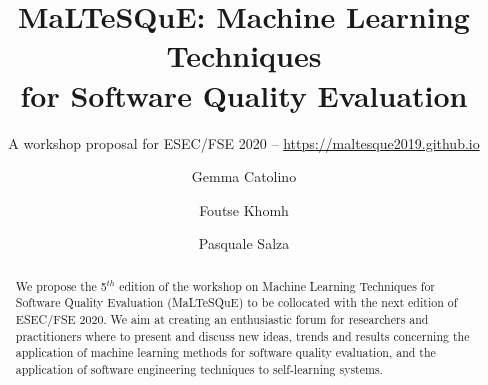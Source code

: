 \documentclass[sigconf,review]{acmart}
\begin{document}
	\title{MaLTeSQuE: Machine Learning Techniques \\
		for Software Quality Evaluation}
	\subtitle{A workshop proposal for ESEC/FSE 2020 -- \url{https://maltesque2019.github.io}}
	
	\author{Gemma Catolino}
	
		\author{Foutse Khomh}
	
	\author{Pasquale Salza}
	
	

\begin{abstract}
We propose the 5$^{th}$ edition of the workshop on Machine Learning Techniques for Software Quality Evaluation (MaLTeSQuE) to be collocated with the next edition of ESEC/FSE 2020.
We aim at creating an enthusiastic forum for researchers and practitioners where to present and discuss new ideas, trends and results concerning the application of machine learning methods for software quality evaluation, and the application of software engineering techniques to self-learning systems.
\end{abstract}


\maketitle









\balance
	
\end{document}
